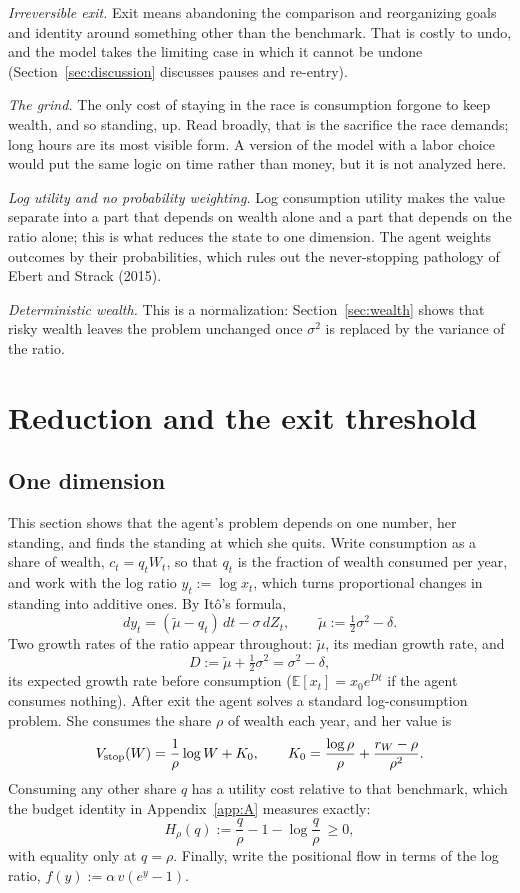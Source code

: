 \documentclass[12pt]{article}
\theoremstyle{definition}
\theoremstyle{remark}
\newcommand{\E}{\mathbb{E}}
\newcommand{\mut}{\tilde\mu}
\theoremstyle{plain}
\theoremstyle{definition}
\begin{document}
\emph{Irreversible exit.} Exit means abandoning the comparison and reorganizing goals and identity around something other than the benchmark. That is costly to undo, and the model takes the limiting case in which it cannot be undone (Section~\ref{sec:discussion} discusses pauses and re-entry).

\emph{The grind.} The only cost of staying in the race is consumption forgone to keep wealth, and so standing, up. Read broadly, that is the sacrifice the race demands; long hours are its most visible form. A version of the model with a labor choice would put the same logic on time rather than money, but it is not analyzed here.

\emph{Log utility and no probability weighting.} Log consumption utility makes the value separate into a part that depends on wealth alone and a part that depends on the ratio alone; this is what reduces the state to one dimension. The agent weights outcomes by their probabilities, which rules out the never-stopping pathology of Ebert and Strack (2015).

\emph{Deterministic wealth.} This is a normalization: Section~\ref{sec:wealth} shows that risky wealth leaves the problem unchanged once $\sigma^2$ is replaced by the variance of the ratio.

\section{Reduction and the exit threshold}\label{sec:threshold}

\subsection{One dimension}

This section shows that the agent's problem depends on one number, her standing, and finds the standing at which she quits. Write consumption as a share of wealth, $c_t=q_tW_t$, so that $q_t$ is the fraction of wealth consumed per year, and work with the log ratio $y_t:=\log x_t$, which turns proportional changes in standing into additive ones. By It\^o's formula,
\begin{equation}
dy_t=(\mut-q_t)\,dt-\sigma\,dZ_t,\qquad \mut:=\tfrac12\sigma^2-\delta . \label{eq:y}
\end{equation}
Two growth rates of the ratio appear throughout: $\mut$, its median growth rate, and
\[
D:=\mut+\tfrac12\sigma^2=\sigma^2-\delta ,
\]
its expected growth rate before consumption ($\E[x_t]=x_0e^{Dt}$ if the agent consumes nothing). After exit the agent solves a standard log-consumption problem. She consumes the share $\rho$ of wealth each year, and her value is
\[
V_{\rm stop}(W)=\frac1\rho\log W+K_0,\qquad K_0=\frac{\log\rho}{\rho}+\frac{r_W-\rho}{\rho^2}.
\]
Consuming any other share $q$ has a utility cost relative to that benchmark, which the budget identity in Appendix~\ref{app:A} measures exactly:
\[
H_\rho(q):=\frac q\rho-1-\log\frac q\rho\ \ge0 ,
\]
with equality only at $q=\rho$. Finally, write the positional flow in terms of the log ratio, $f(y):=\alpha\,v(e^y-1)$.
\end{document}
